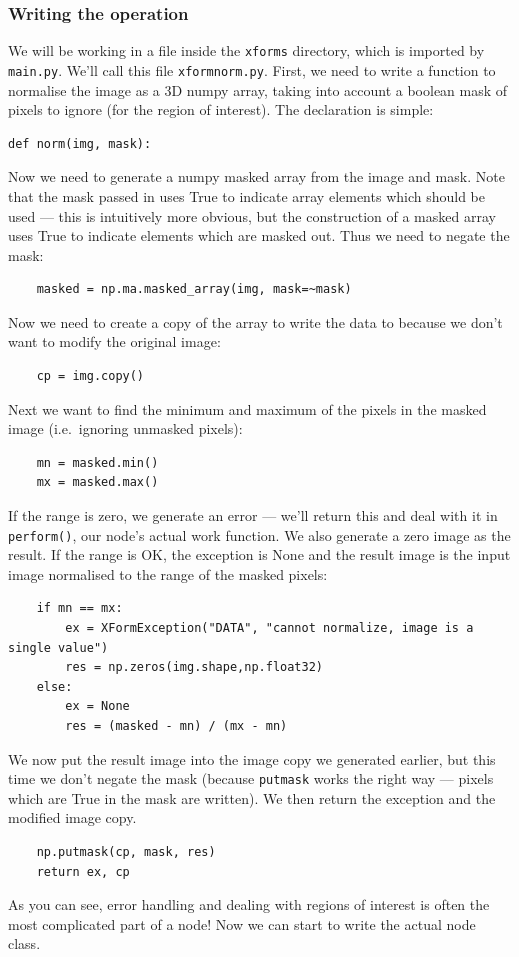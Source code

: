 \subsubsection{Writing the operation}
We will be working in a file inside the \texttt{xforms} directory, which is
imported by \texttt{main.py}. We'll call this file \texttt{xformnorm.py}.
First, we need to write a function to normalise the image as a 3D numpy array,
taking into account a boolean mask of pixels to ignore (for the region
of interest). The declaration is simple:
\begin{lstlisting}
def norm(img, mask):
\end{lstlisting}
Now we need to generate a numpy masked array from the image and mask.
Note that the mask passed in uses True to indicate array elements which should
be used --- this is intuitively more obvious, but the construction
of a masked array uses True to indicate elements which are masked out. Thus
we need to negate the mask:
\begin{lstlisting}
    masked = np.ma.masked_array(img, mask=~mask)
\end{lstlisting}
Now we need to create a copy of the array to write the data to because we
don't want to modify the original image:
\begin{lstlisting}
    cp = img.copy()
\end{lstlisting}
Next we want to find the minimum and maximum of the pixels in the masked
image (i.e.\ ignoring unmasked pixels):
\begin{lstlisting}
    mn = masked.min()
    mx = masked.max()
\end{lstlisting}
If the range is zero, we generate an error --- we'll return this and deal
with it in \texttt{perform()}, our node's actual work function. We also
generate a zero image as the result.
If the range is OK, the exception is None and the result image is
the input image normalised
to the range of the masked pixels:
\begin{lstlisting}
    if mn == mx:
        ex = XFormException("DATA", "cannot normalize, image is a single value")
        res = np.zeros(img.shape,np.float32)
    else:
        ex = None
        res = (masked - mn) / (mx - mn)
\end{lstlisting}
We now put the result image into the image copy we generated earlier,
but this time we don't negate the mask (because \texttt{putmask} works
the right way --- pixels which are True in the mask are written). We 
then return the exception and the modified image copy.
\begin{lstlisting}
    np.putmask(cp, mask, res)
    return ex, cp
\end{lstlisting}
As you can see, error handling and dealing with regions of interest
is often the most complicated part of a node!
Now we can start to write the actual node class.
